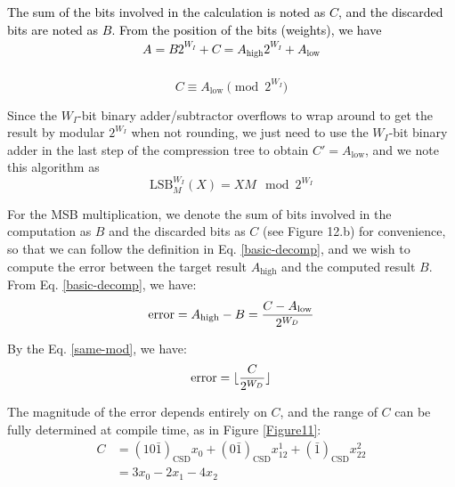 \documentclass[conference]{IEEEtran}
\begin{document}
\textcolor{black}{
The sum of the bits involved in the calculation is noted as $C$, and the discarded bits are noted as $B$. From the position of the bits (weights), we have
\begin{equation}
    \begin{split}
    A = B 2^{W_I} + C = A_{\text{high}}2^{W_I} + A_{\text{low}} \\
    \end{split} 
    \label{basic-decomp}
\end{equation}
}

\begin{equation}
    C \equiv A_{\text{low}}\pmod{2^{W_I}}
    \label{same-mod}
\end{equation}


Since the $W_I$-bit binary adder/subtractor overflows to wrap around to get the result by modular $2^{W_I}$ when not rounding, we just need to use the $W_I$-bit binary adder in the last step of the compression tree to obtain $C' = A_{\text{low}}$, and we note this algorithm as
\begin{equation}
    \text{LSB}^{W_I}_M(X) = XM\mod 2^{W_I}
\end{equation}


For the MSB multiplication, we denote the sum of bits involved in the computation as $B$ and the discarded bits as $C$ (see Figure 12.b) for convenience, so that we can follow the definition in Eq. \ref{basic-decomp}, and we wish to compute the error between the target result $A_{\text{high}}$ and the computed result $B$. From Eq. \ref{basic-decomp}, we have:
\begin{equation}
    \text{error} = A_\text{high} - B = {{C - A_\text{low}}\over{2^{W_D}}}
\end{equation}


By the Eq. \ref{same-mod}, we have:
\begin{equation}
    \text{error} = \lfloor {C \over 2^{W_D}} \rfloor
\end{equation}


The magnitude of the error depends entirely on $C$, and the range of $C$ can be fully determined at compile time, as in Figure \ref{Figure11}:
\begin{equation}
    \begin{split}
    C &= (10\bar{1})_{\text{CSD}}x_0 + (0\bar{1})_{\text{CSD}}x_12^1 + (\bar{1})_{\text{CSD}}x_22^2\\
    &= 3x_0 - 2x_1 - 4x_2
    \end{split} 
\end{equation}
\end{document}
